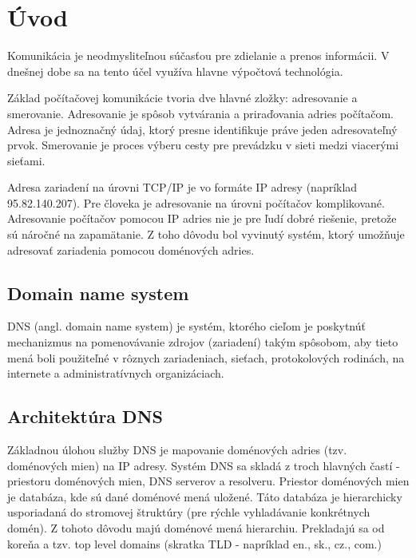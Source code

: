 
%


\newcommand*{\addNewChapter}[2][1]{\addtocounter{chapterCounter}{#1}\chapter{#2}\label{#2}}


\addNewChapter{Úvod}
Komunikácia je neodmysliteľnou súčasťou pre zdielanie a prenos informácii. V dnešnej dobe sa na tento účel využíva hlavne výpočtová technológia.

Základ počítačovej komunikácie tvoria dve hlavné zložky: adresovanie a smerovanie. Adresovanie je spôsob vytvárania a priraďovania adries počítačom. 
Adresa je jednoznačný údaj, ktorý presne identifikuje práve jeden adresovateľný prvok. Smerovanie je proces výberu cesty pre prevádzku v sieti medzi viacerými sieťami. \cite{Smerovanie}

Adresa zariadení na úrovni TCP/IP je vo formáte IP adresy (napríklad 95.82.140.207). 
Pre človeka je adresovanie na úrovni počítačov komplikované. Adresovanie počítačov pomocou IP adries nie je pre ľudí dobré riešenie, pretože sú náročné na zapamätanie.
Z toho dôvodu bol vyvinutý systém, ktorý umožňuje adresovať zariadenia pomocou doménových adries.

\section{Domain name system}
\label{Domain name system}
DNS (angl. domain name system) je systém, ktorého cieľom je poskytnúť mechanizmus na pomenovávanie
zdrojov (zariadení) takým spôsobom, aby tieto mená boli použiteľné v rôznych zariadeniach, sieťach, protokolových rodinách, 
na internete a administratívnych organizáciach. \cite{rfc1035} 

\section{Architektúra DNS}
Základnou úlohou služby DNS je mapovanie doménových adries (tzv. doménových mien) na IP adresy. 
Systém DNS sa skladá z troch hlavných častí - priestoru doménových mien, DNS serverov a resolveru. Priestor doménových mien je databáza, kde sú dané doménové mená uložené. 
Táto databáza je hierarchicky usporiadaná do stromovej štruktúry (pre rýchle vyhladávanie konkrétnych domén). \cite{Matoušek}
Z tohoto dôvodu majú doménové mená hierarchiu. Prekladajú sa od koreňa a tzv. top level domains (skratka TLD - napríklad en., sk., cz., com.)



